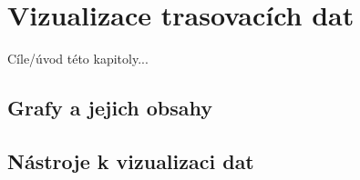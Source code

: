 \chapter{Vizualizace trasovacích dat}

Cíle/úvod této kapitoly...

\section{Grafy a jejich obsahy}

\section{Nástroje k vizualizaci dat}